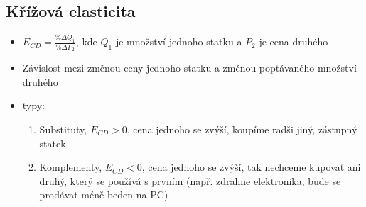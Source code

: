 \subsection{Křížová elasticita}
\begin{itemize}
    \item $E_{CD}=\frac{\% \Delta Q_1}{\% \Delta P_2}$, kde $Q_1$ je množství jednoho statku a $P_2$ je cena druhého
    \item Závislost mezi změnou ceny jednoho statku a změnou poptávaného množství druhého
    \item typy:
    \begin{enumerate}
        \item Substituty, $E_{CD}>0$, cena jednoho se zvýší, koupíme radši jiný, zástupný statek
        \item Komplementy, $E_{CD}<0$, cena jednoho se zvýší, tak nechceme kupovat ani druhý,
        který se používá s prvním (např. zdrahne elektronika, bude se prodávat méně beden na PC)
    \end{enumerate}
\end{itemize}
